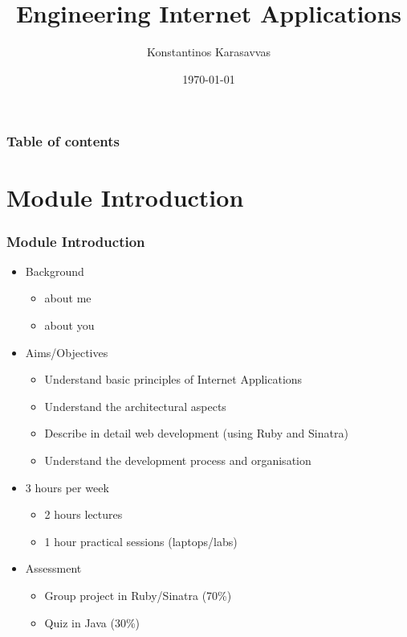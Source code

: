 \documentclass{beamer}
\begin{document}
\title{Engineering Internet Applications}
\author[Konstantinos Karasavvas]{Konstantinos Karasavvas} %

\date{\today} 

\begin{frame}
  \titlepage
\end{frame}

\begin{frame}
\setcounter{tocdepth}{1}
\frametitle{Table of contents}
\tableofcontents
\end{frame} 





\section{Module Introduction} 
\begin{frame}\frametitle{Module Introduction} 
  \begin{itemize}
    \item Background 
    \begin{itemize}
      \item about me
      \item about you 
    \end{itemize}
    \pause
    \item Aims/Objectives
    \begin{itemize}
      \item Understand basic principles of Internet Applications
      \item Understand the architectural aspects
      \item Describe in detail web development (using Ruby and Sinatra)
      \item Understand the development process and organisation
    \end{itemize}
    \pause
    \item 3 hours per week
    \begin{itemize}
      \item 2 hours lectures
      \item 1 hour practical sessions (laptops/labs)
    \end{itemize}
    \pause
    \item Assessment
    \begin{itemize}
      \item Group project in Ruby/Sinatra (70\%)
      \item Quiz in Java (30\%)
    \end{itemize}
    
  \end{itemize}
\end{frame}
\end{document}
